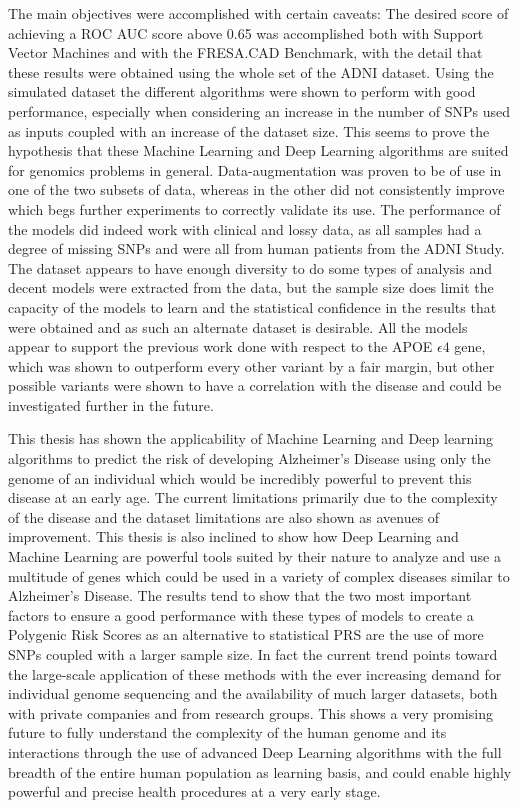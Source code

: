 The main objectives were accomplished with certain caveats: The desired score of achieving a ROC AUC score above 0.65 was accomplished both with Support Vector Machines and with the FRESA.CAD Benchmark, with the detail that these results were obtained using the whole set of the ADNI dataset. Using the simulated dataset the different algorithms were shown to perform with good performance, especially when considering an increase in the number of SNPs used as inputs coupled with an increase of the dataset size. This seems to prove the hypothesis that these Machine Learning and Deep Learning algorithms are suited for genomics problems in general. Data-augmentation was proven to be of use in one of the two subsets of data, whereas in the other did not consistently improve which begs further experiments to correctly validate its use. The performance of the models did indeed work with clinical and lossy data, as all samples had a degree of missing SNPs and were all from human patients from the ADNI Study. The dataset appears to have enough diversity to do some types of analysis and decent models were extracted from the data, but the sample size does limit the capacity of the models to learn and the statistical confidence in the results that were obtained and as such an alternate dataset is desirable. All the models appear to support the previous work done with respect to the APOE $\epsilon4$ gene, which was shown to outperform every other variant by a fair margin, but other possible variants were shown to have a correlation with the disease and could be investigated further in the future.

This thesis has shown the applicability of Machine Learning and Deep learning algorithms to predict the risk of developing Alzheimer's Disease using only the genome of an individual which would be incredibly powerful to prevent this disease at an early age. The current limitations primarily due to the complexity of the disease and the dataset limitations are also shown as avenues of improvement. This thesis is also inclined to show how Deep Learning and Machine Learning are powerful tools suited by their nature to analyze and use a multitude of genes which could be used in a variety of complex diseases similar to Alzheimer's Disease. The results tend to show that the two most important factors to ensure a good performance with these types of models to create a Polygenic Risk Scores as an alternative to statistical PRS are the use of more SNPs coupled with a larger sample size. In fact the current trend points toward the large-scale application of these methods with the ever increasing demand for individual genome sequencing and the availability of much larger datasets, both with private companies and from research groups. This shows a very promising future to fully understand the complexity of the human genome and its interactions through the use of advanced Deep Learning algorithms with the full breadth of the entire human population as learning basis, and could enable highly powerful and precise health procedures at a very early stage.


